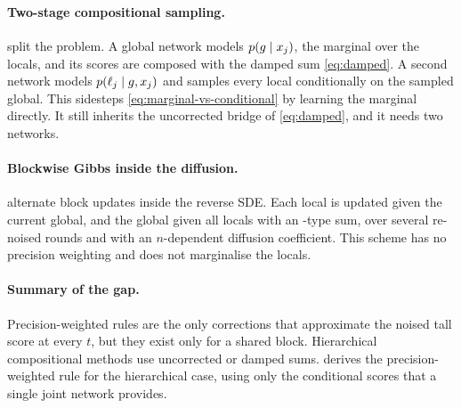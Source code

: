 \paragraph{Two-stage compositional sampling.}
\citet{arruda2025compositional} split the problem.
A global network models $p(g\mid x_j)$, the marginal over the locals, and its scores are composed with the damped sum \cref{eq:damped}.
A second network models $p(\ell_j\mid g,x_j)$ and samples every local conditionally on the sampled global.
This sidesteps \cref{eq:marginal-vs-conditional} by learning the marginal directly.
It still inherits the uncorrected bridge of \cref{eq:damped}, and it needs two networks.

\paragraph{Blockwise Gibbs inside the diffusion.}
\citet{zaballa2026hierarchical} alternate block updates inside the reverse SDE.
Each local is updated given the current global, and the global given all locals with an \fnpse-type sum, over several re-noised rounds and with an $n$-dependent diffusion coefficient.
This scheme has no precision weighting and does not marginalise the locals.

\paragraph{Summary of the gap.}
Precision-weighted rules are the only corrections that approximate the noised tall score at every $t$, but they exist only for a shared block.
Hierarchical compositional methods use uncorrected or damped sums.
 derives the precision-weighted rule for the hierarchical case, using only the conditional scores that a single joint network provides.
